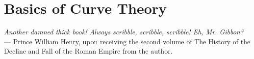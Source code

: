 

%
%
%
%
%
%
%
%
%

\chapter{Basics of Curve Theory}

\begin{center}
\emph{Another damned thick book! Always scribble, scribble, scribble! Eh, Mr. Gibbon?} --- \scriptsize{Prince William Henry, upon receiving the second  volume of The History of the Decline and Fall of the Roman Empire from the author.}
\end{center}


%
%
%
%
%
%
%
%
%
%

